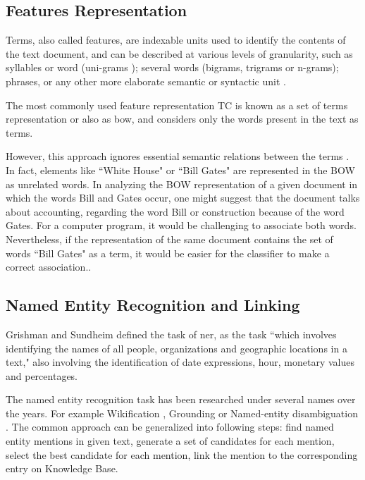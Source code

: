 \subsection{\hspace*{3pt}Features Representation}

Terms, also called features\cite{Sebastiani:2002}, are indexable units used to identify the contents of the text document, and can be described at various levels of granularity, such as syllables or word (uni-grams ); several words (bigrams, trigrams or n-grams); phrases, or any other more elaborate semantic or syntactic unit \cite{Lan:2009}.

The most commonly used feature representation TC is known as a set of terms representation or also as \gls{bow}, and considers only the words present in the text as terms.
 
However, this approach ignores essential semantic relations between the terms \cite {Hu:2008}.
In fact, elements like ``White House" or ``Bill Gates" are represented in the BOW as unrelated words. In analyzing the BOW representation of a given document in which the words Bill and Gates occur, one might suggest that the document talks about accounting, regarding the word Bill or construction because of the word Gates. For a computer program, it would be challenging to associate both words.
Nevertheless, if the representation of the same document contains the set of words ``Bill Gates" as a term, it would be easier for the classifier to make a correct association.\cite{bekkerman2004using}.



\subsection{\hspace*{3pt}Named Entity Recognition and Linking }


Grishman and  Sundheim \cite{grishman1996message} defined the task of \gls{ner}, as the task ``which involves identifying the names of all people, organizations and geographic locations in a text," also involving the identification of date expressions, hour, monetary values and percentages. 


The named entity recognition task has been researched under several names over the years. For example Wikification \cite{Ratinov:2011}, Grounding \cite{leidner2003grounding} or Named-entity disambiguation \cite{hoffart2011robust}. The common approach can be generalized into following steps: find named entity mentions in given text, generate a set of candidates for each mention, select the best candidate for each mention, link the mention to the corresponding entry on Knowledge Base.

